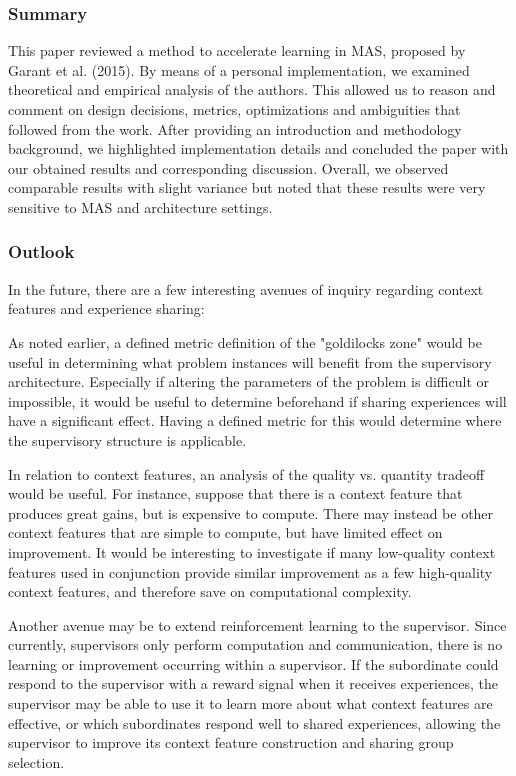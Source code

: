 \documentclass[letterpaper]{article}
\begin{document}
\subsubsection{Summary}
This paper reviewed a method to accelerate learning in MAS, proposed by Garant et al. (2015). By means of a personal implementation, we examined theoretical and empirical analysis of the authors. This allowed us to reason and comment on design decisions, metrics, optimizations and ambiguities that followed from the work. After providing an introduction and methodology background, we highlighted implementation details and concluded the paper with our obtained results and corresponding discussion. Overall, we observed comparable results with slight variance but noted that these results were very sensitive to MAS and architecture settings.

\subsubsection{Outlook}
In the future, there are a few interesting avenues of inquiry regarding context features and experience sharing:

As noted earlier, a defined metric definition of the "goldilocks zone" would be useful in determining what problem instances will benefit from the supervisory architecture.  Especially if altering the parameters of the problem is difficult or impossible, it would be useful to determine beforehand if sharing experiences will have a significant effect.  Having a defined metric for this would determine where the supervisory structure is applicable.

In relation to context features, an analysis of the quality vs. quantity tradeoff would be useful.  For instance, suppose that there is a context feature that produces great gains, but is expensive to compute.  There may instead be other context features that are simple to compute, but have limited effect on improvement.  It would be interesting to investigate if many low-quality context features used in conjunction provide similar improvement as a few high-quality context features, and therefore save on computational complexity.

Another avenue may be to extend reinforcement learning to the supervisor.  Since currently, supervisors only perform computation and communication, there is no learning or improvement occurring within a supervisor.  If the subordinate could respond to the supervisor with a reward signal when it receives experiences, the supervisor may be able to use it to learn more about what context features are effective, or which subordinates respond well to shared experiences, allowing the supervisor to improve its context feature construction and sharing group selection.
\end{document}
